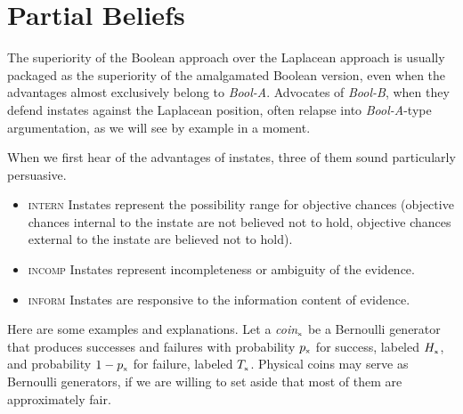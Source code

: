 \documentclass[11pt]{article}
\newcommand{\anderson}[0]{\textit{Bool-A}}
\newcommand{\augustin}[0]{\textit{Bool-B}}
\begin{document}

\section{Partial Beliefs}
\label{amalgamated}

The superiority of the Boolean approach over the Laplacean
approach is usually packaged as the superiority of the amalgamated
Boolean version, even when the advantages almost exclusively belong to
{\anderson}. Advocates of {\augustin}, when they defend instates
against the Laplacean position, often relapse into {\anderson}-type
argumentation, as we will see by example in a moment.

When we first hear of the advantages of instates, three of
them sound particularly persuasive.

\begin{itemize}
\item \textsc{intern} Instates represent the possibility range for
  objective chances (objective chances internal to the instate are not
  believed not to hold, objective chances external to the instate are
  believed not to hold).
\item \textsc{incomp} Instates represent incompleteness or
  ambiguity of the evidence.
\item \textsc{inform} Instates are responsive to the information
  content of evidence.
\end{itemize}

Here are some examples and explanations. Let a
\textit{coin}$_{\mbox{\tiny{x}}}$ be a Bernoulli generator that
produces successes and failures with probability $p_{\mbox{\tiny{x}}}$
for success, labeled $H_{\mbox{\tiny{x}}}$, and probability
$1-p_{\mbox{\tiny{x}}}$ for failure, labeled $T_{\mbox{\tiny{x}}}$.
Physical coins may serve as Bernoulli generators, if we are willing to
set aside that most of them are approximately fair.
\end{document}
